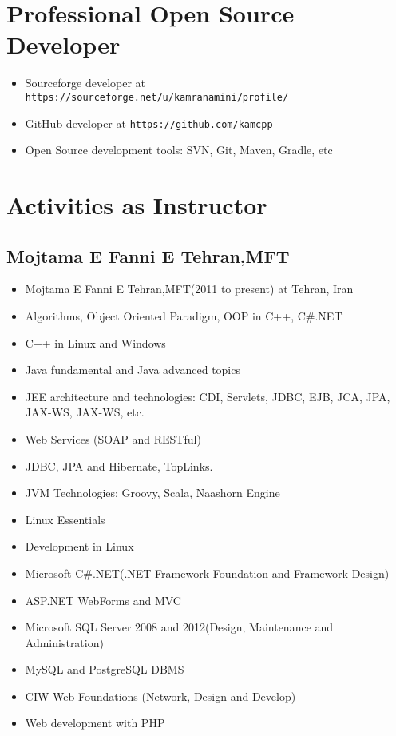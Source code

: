 \documentclass[12pt,a4paper]{article}
\begin{document}
\section{Professional Open Source Developer}
		\begin{itemize}
			\item Sourceforge developer at \texttt{https://sourceforge.net/u/kamranamini/profile/}
			\item GitHub developer at \texttt{https://github.com/kamcpp}
			\item Open Source development tools: SVN, Git, Maven, Gradle, etc
		\end{itemize}
		
\section{Activities as Instructor}
	\subsection{Mojtama E Fanni E Tehran,MFT}
		\begin{itemize}
			\item Mojtama E Fanni E Tehran,MFT(2011 to present) at Tehran, Iran
			\item Algorithms, Object Oriented Paradigm, OOP in C++, C\#.NET
			\item C++ in Linux and Windows
			\item Java fundamental and Java advanced topics
			\item JEE architecture and technologies: CDI, Servlets, JDBC, EJB, JCA, JPA, JAX-WS, JAX-WS, etc.
			\item Web Services (SOAP and RESTful)
			\item JDBC, JPA and Hibernate, TopLinks.
			\item JVM Technologies: Groovy, Scala, Naashorn Engine
			\item Linux Essentials
			\item Development in Linux
			\item Microsoft C\#.NET(.NET Framework Foundation and Framework Design)
			\item ASP.NET WebForms and MVC
			\item Microsoft SQL Server 2008 and 2012(Design, Maintenance and Administration)
			\item MySQL and PostgreSQL DBMS
			\item CIW Web Foundations (Network, Design and Develop)
			\item Web development with PHP 
		\end{itemize}
\end{document}
